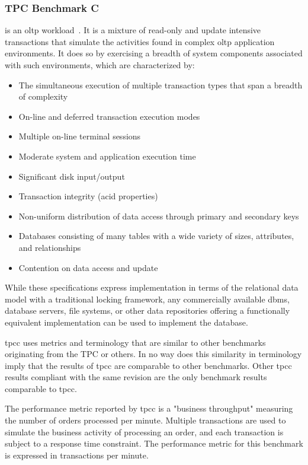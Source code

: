 \subsubsection{TPC Benchmark C}
 is an \gls{oltp} workload~\cite{council2010tpc}. It is a mixture of read-only and update intensive transactions that simulate the activities found in complex \gls{oltp} application environments. It does so by exercising a breadth of system components associated with such environments, which are characterized by:

\begin{itemize}
    \item The simultaneous execution of multiple transaction types that span a breadth of complexity
    \item On-line and deferred transaction execution modes
    \item Multiple on-line terminal sessions
    \item Moderate system and application execution time
    \item Significant disk input/output
    \item Transaction integrity (\gls{acid} properties)
    \item Non-uniform distribution of data access through primary and secondary keys
    \item Databases consisting of many tables with a wide variety of sizes, attributes, and relationships
    \item Contention on data access and update
\end{itemize}

While these specifications express implementation in terms of the relational data model with a traditional locking framework, any commercially available \gls{dbms}, database servers, file systems, or other data repositories offering a functionally equivalent implementation can be used to implement the database.

\gls{tpcc} uses metrics and terminology that are similar to other benchmarks originating from the TPC or others. In no way does this similarity in terminology imply that the results of \gls{tpcc} are comparable to other benchmarks. Other \gls{tpcc} results compliant with the same revision are the only benchmark results comparable to \gls{tpcc}.

The performance metric reported by \gls{tpcc} is a "business throughput" measuring the number of orders processed per minute. Multiple transactions are used to simulate the business activity of processing an order, and each transaction is subject to a response time constraint. The performance metric for this benchmark is expressed in transactions per minute. 

